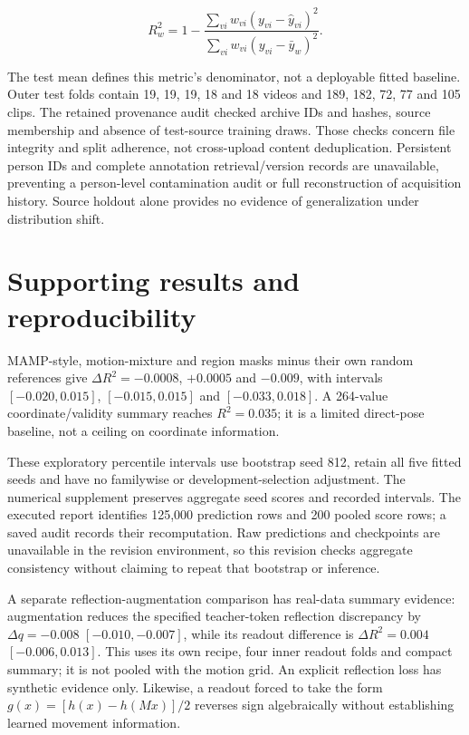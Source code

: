 \documentclass{article}
\begin{document}
\[R_w^2=1-\frac{\sum_{vi}w_{vi}(y_{vi}-\hat y_{vi})^2}{\sum_{vi}w_{vi}(y_{vi}-\bar y_w)^2}.\]

The test mean defines this metric's denominator, not a deployable fitted
baseline. Outer test folds contain 19, 19, 19, 18 and 18 videos and 189,
182, 72, 77 and 105 clips. The retained provenance audit checked archive
IDs and hashes, source membership and absence of test-source training
draws. Those checks concern file integrity and split adherence, not
cross-upload content deduplication. Persistent person IDs and complete
annotation retrieval/version records are unavailable, preventing a
person-level contamination audit or full reconstruction of acquisition
history. Source holdout alone provides no evidence of generalization
under distribution shift.

\section{Supporting results and
reproducibility}\label{supporting-results-and-reproducibility}

MAMP-style, motion-mixture and region masks minus their own random
references give \(\Delta R^2=-0.0008\), \(+0.0005\) and \(-0.009\), with
intervals \([-0.020,0.015]\), \([-0.015,0.015]\) and \([-0.033,0.018]\).
A 264-value coordinate/validity summary reaches \(R^2=0.035\); it is a
limited direct-pose baseline, not a ceiling on coordinate information.

These exploratory percentile intervals use bootstrap seed 812, retain
all five fitted seeds and have no familywise or development-selection
adjustment. The numerical supplement preserves aggregate seed scores and
recorded intervals. The executed report identifies 125,000 prediction
rows and 200 pooled score rows; a saved audit records their
recomputation. Raw predictions and checkpoints are unavailable in the
revision environment, so this revision checks aggregate consistency
without claiming to repeat that bootstrap or inference.

A separate reflection-augmentation comparison has real-data summary
evidence: augmentation reduces the specified teacher-token reflection
discrepancy by \(\Delta q=-0.008\) \([-0.010,-0.007]\), while its
readout difference is \(\Delta R^2=0.004\) \([-0.006,0.013]\). This uses
its own recipe, four inner readout folds and compact summary; it is not
pooled with the motion grid. An explicit reflection loss has synthetic
evidence only. Likewise, a readout forced to take the form
\(g(x)=[h(x)-h(Mx)]/2\) reverses sign algebraically without establishing
learned movement information.
\end{document}
